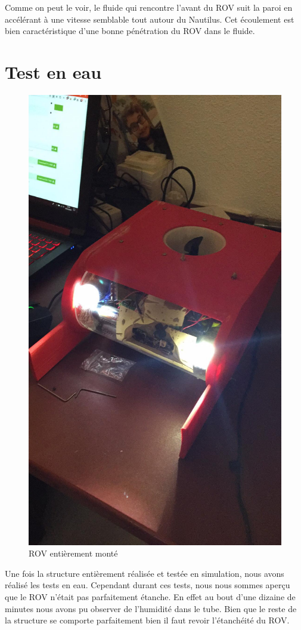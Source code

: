 \documentclass[a4paper,11pt]{report}
\begin{document}
					
				Comme on peut le voir, le fluide qui rencontre l'avant du ROV suit la paroi en accélérant à une vitesse semblable tout autour du Nautilus. Cet écoulement est bien caractéristique d'une bonne pénétration du ROV dans le fluide.\newpage
				
				\section{Test en eau}
				
				\begin{figure}[!h]
					\begin{center}
						\includegraphics[scale=0.1]{Photos/Capture24.jpeg}
						\caption{ROV entièrement monté}
					\end{center}
				\end{figure}
				Une fois la structure entièrement réalisée et testée en simulation, nous avons réalisé les tests en eau. Cependant durant ces tests, nous nous sommes aperçu que le ROV n'était pas parfaitement étanche. En effet au bout d'une dizaine de minutes nous avons pu observer de l'humidité dans le tube. Bien que le reste de la structure se comporte parfaitement bien il faut revoir l'étanchéité du ROV.
			
\end{document}
